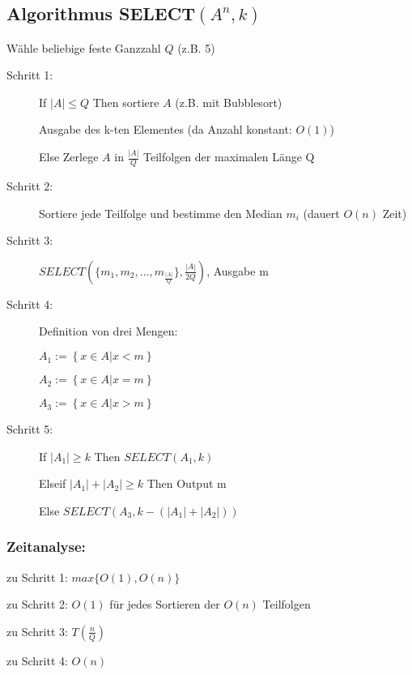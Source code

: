  \subsection{Algorithmus \texorpdfstring{SELECT$(A^{n},k)$}{SELECT (An,k)}}
 Wähle beliebige feste Ganzzahl $Q$ (z.B. 5)
 \begin{description}
  \item[Schritt 1:] 
  
  If $\left|A\right|\leq Q$ Then sortiere $A$ \hfill(z.B. mit Bubblesort)

  \hspace{2cm}Ausgabe des k-ten Elementes \hfill(da Anzahl konstant: $O(1)$)

  \hspace{1cm}Else Zerlege $A$ in $\frac{\left|A\right|}{Q}$ Teilfolgen der maximalen Länge Q
  \item[Schritt 2:] Sortiere jede Teilfolge und bestimme den Median $m_{i}$ \hfill(dauert $O(n)$ Zeit)
  \item[Schritt 3:] $SELECT(\{m_{1}, m_{2}, \ldots , m_{\frac{\left|A\right|}{Q}}\},\frac{\left|A\right|}{2Q})$, Ausgabe m
  \item[Schritt 4:] Definition von drei Mengen:

  $A_{1}:=\left\{x\in A|x<m\right\}$

  $A_{2}:=\left\{x\in A|x=m\right\}$

  $A_{3}:=\left\{x\in A|x>m\right\}$
  \item[Schritt 5:] If $\left|A_{1}\right|\geq k$ Then $SELECT (A_{1},k)$

  \hspace{1cm}Elseif $\left|A_{1}\right|+\left|A_{2}\right|\geq k$ Then Output m

  \hspace{1cm}Else $SELECT (A_{3},k-(\left|A_{1}\right|+\left|A_{2}\right|))$
 \end{description}
 
  \subsubsection{Zeitanalyse:}
 \hspace{4mm}zu Schritt 1: $max\{O(1),O(n)\}$

 zu Schritt 2: $O(1)$ für jedes Sortieren der $O(n)$ Teilfolgen

 zu Schritt 3: $T(\frac{n}{Q})$

 zu Schritt 4: $O(n)$

